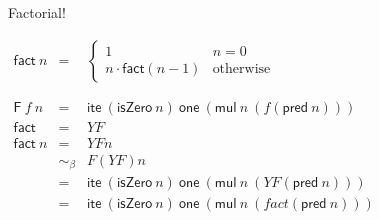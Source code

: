\documentclass{beamer}
\begin{document}
\begin{frame}{Factorial!}
  \begin{math}
  \end{math}
  \\
  \begin{center}
    \begin{math}
      \begin{array}{rcl}
        \mathsf{fact}~n
        & =
        & \begin{cases}
            1 & n = 0 \\
            n\cdot\mathsf{fact}(n-1) & \text{otherwise}
          \end{cases}
        \\
        \\
        \\
        \mathsf{F}~f~n
          & =
          & \mathsf{ite}~(\mathsf{isZero}~n)~\mathsf{one}~(\mathsf{mul}~n~(f(\mathsf{pred}~n)))
          \\
        \mathsf{fact}
          & =
          & YF
          \\
        \mathsf{fact}~n
          & =
          & YFn
          \\
          & \sim_\beta
          & F(YF)n
          \\
          & =
          & \mathsf{ite}~(\mathsf{isZero}~n)~\mathsf{one}~(\mathsf{mul}~n~(YF(\mathsf{pred}~n)))
          \\
          & =
          & \mathsf{ite}~(\mathsf{isZero}~n)~\mathsf{one}~(\mathsf{mul}~n~(fact(\mathsf{pred}~n)))
      \end{array}
    \end{math}
  \end{center}
\end{frame}
\end{document}
